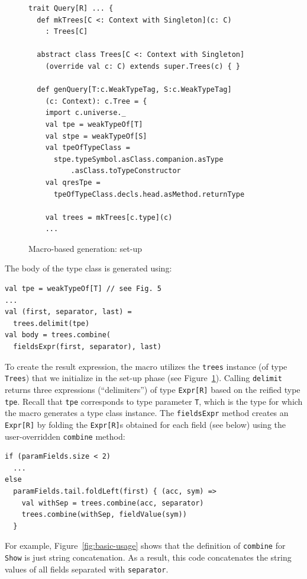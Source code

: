 \documentclass[preprint,nocopyrightspace]{sigplanconf}
\begin{document}
\begin{figure}
\centering
\begin{lstlisting}
trait Query[R] ... {
  def mkTrees[C <: Context with Singleton](c: C)
    : Trees[C]

  abstract class Trees[C <: Context with Singleton]
    (override val c: C) extends super.Trees(c) { }

  def genQuery[T:c.WeakTypeTag, S:c.WeakTypeTag]
    (c: Context): c.Tree = {
    import c.universe._
    val tpe = weakTypeOf[T]
    val stpe = weakTypeOf[S]
    val tpeOfTypeClass =
      stpe.typeSymbol.asClass.companion.asType
          .asClass.toTypeConstructor
    val qresTpe =
      tpeOfTypeClass.decls.head.asMethod.returnType

    val trees = mkTrees[c.type](c)
    ...
\end{lstlisting}
  \caption{Macro-based generation: set-up}
  \label{fig:macro-set-up}
\end{figure}

The body of the type class is generated using:
\begin{lstlisting}
val tpe = weakTypeOf[T] // see Fig. 5
...
val (first, separator, last) =
  trees.delimit(tpe)
val body = trees.combine(
  fieldsExpr(first, separator), last)
\end{lstlisting}

To create the result expression, the macro utilizes the \verb|trees| instance
(of type \verb|Trees|) that we initialize in the set-up phase (see
Figure~\ref{fig:macro-set-up}). Calling \verb|delimit| returns three expressions
(``delimiters'') of type \verb|Expr[R]| based on the reified type \verb|tpe|. Recall
that \verb|tpe| corresponds to type parameter \verb|T|, which is the type for
which the macro generates a type class instance. The \verb|fieldsExpr| method
creates an \verb|Expr[R]| by folding the \verb|Expr[R]|s obtained for each field
(see below) using the user-overridden \verb|combine| method:

\begin{lstlisting}
if (paramFields.size < 2)
  ...
else
  paramFields.tail.foldLeft(first) { (acc, sym) =>
    val withSep = trees.combine(acc, separator)
    trees.combine(withSep, fieldValue(sym))
  }
\end{lstlisting}

For example, Figure~\ref{fig:basic-usage} shows that the definition of
\verb|combine| for \verb|Show| is just string concatenation. As a result, this
code concatenates the string values of all fields separated with
\verb|separator|.
\end{document}
